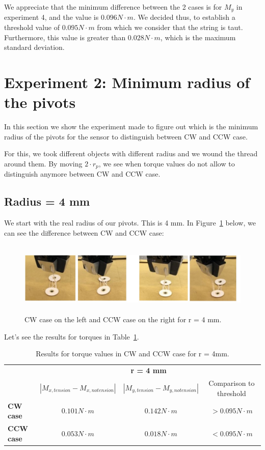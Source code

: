 We appreciate that the minimum difference between the 2 cases is for $M_{y}$ in experiment 4, and the value is $0.096 N \cdot m$. We decided thus, to establish a threshold value of \textbf{$0.095 N \cdot m$} from which we consider that the string is taut. Furthermore, this value is greater than $0.028 N\cdot m$, which is the maximum standard deviation. 

\section{Experiment 2: Minimum radius of the pivots}
In this section we show the experiment made to figure out which is the minimum radius of the pivots for the sensor to distinguish between CW and CCW case.

For this, we took different objects with different radius and we wound the thread around them. By moving $2 \cdot r_{p}$, we see when torque values do not allow to distinguish anymore between CW and CCW case.

\subsection{Radius = 4 mm}
We start with the real radius of our pivots. This is 4 mm. In Figure~\ref{fig:CWCCW1} below, we can see the difference between CW and CCW case:
\begin{figure}[h!]
	\centering
	\includegraphics[height=35mm]{chapters/figures/experiments/exp2_CWCCW1.jpg}
	\caption{CW case on the left and CCW case on the right for r = 4 mm.}
	\label{fig:CWCCW1}
\end{figure}

Let's see the results for torques in Table~\ref{tab:4mm}.
\begin{table}[htbp]
	\centering
	\begin{tabular}{|l|c|c|c|}
		\cmidrule{2-4}    \multicolumn{1}{r|}{} & \multicolumn{3}{c|}{\textbf{r = 4 mm}} \\
		\cmidrule{2-4}    \multicolumn{1}{r|}{} & \textbf{$|M_{x, tension} - M_{x, no tension}|$} & \textbf{$|M_{y, tension} - M_{y, no tension}|$} & Comparison to threshold \\
		\cmidrule{1-4}
		\textbf{CW case} & $0.101 N \cdot m$ & $0.142 N \cdot m$ & $> 0.095 N \cdot m$ \\
		\midrule
		\textbf{CCW case} & $0.053 N \cdot m$ & $0.018 N \cdot m$ & $< 0.095 N \cdot m$ \\
		\bottomrule
	\end{tabular}%
	\caption{Results for torque values in CW and CCW case for r = 4mm.}
	\label{tab:4mm}%
\end{table}%

